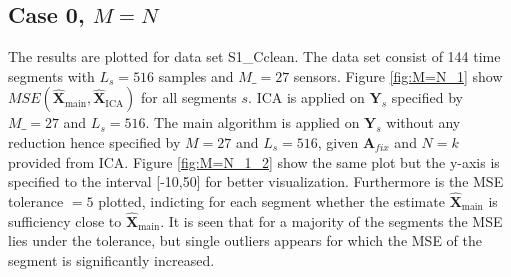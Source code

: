 \subsection{Case 0, $M=N$}
The results are plotted for data set S1\_Cclean. The data set consist of 144 time segments with $L_s = 516$ samples and $M\_ = 27$ sensors. Figure \ref{fig:M=N_1} show $MSE\left(\hat{\mathbf{X}}_{\text{main}},\hat{\mathbf{X}}_{\text{ICA}}\right)$ for all segments $s$. ICA is applied on $\textbf{Y}_s$ specified by $M\_ = 27$ and $L_s = 516$. The main algorithm is applied on $\textbf{Y}_s$ without any reduction hence specified by $M=27$ and $L_s=516$, given $\textbf{A}_{fix}$ and $N = k$ provided from ICA.
Figure \ref{fig:M=N_1_2} show the same plot but the y-axis is specified to the interval [-10,50] for better visualization.
Furthermore is the MSE tolerance $= 5$ plotted, indicting for each segment whether the estimate $\hat{\mathbf{X}}_{\text{main}}$ is sufficiency close to $\hat{\mathbf{X}}_{\text{main}}$. It is seen that for a majority of the segments the MSE lies under the tolerance, but single outliers appears for which the MSE of the segment is significantly increased.    
